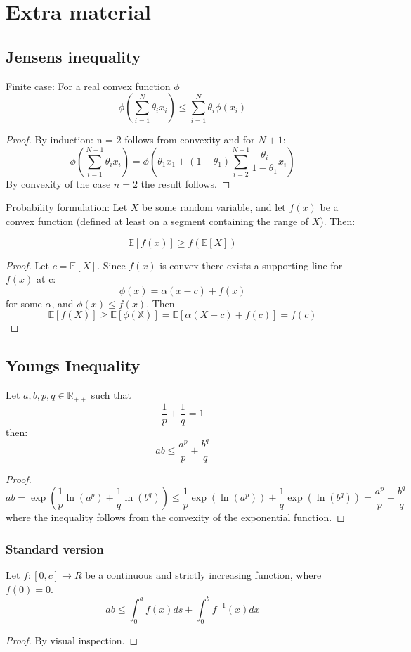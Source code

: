 \documentclass[titlepage]{article}
\begin{document}
\section{Extra material}
\subsection{Jensens inequality}
Finite case: For a real convex function $\phi$
$$\phi\left(\sum_{i= 1}^N \theta_ix_i\right) \leq \sum_{i=1}^N\theta_i \phi(x_i)$$
\begin{proof}
By induction: n = 2 follows from convexity and for $N+1$:
$$\phi\left(\sum_{i= 1}^{N+1} \theta_ix_i\right) =  \phi\left(\theta_1x_1 + (1-\theta_1)\sum_{i= 2}^{N+1} \frac{\theta_i}{1-\theta_1}x_i\right) $$
By convexity of the case $n= 2$ the result follows.
\end{proof}
Probability formulation:
Let $X$ be some random variable, and let $f(x)$ be a convex function (defined at least on a segment containing the range of $X$). Then:

$$\mathbb{E}[f(x)] \geq f(\mathbb{E}[X])$$
\begin{proof}
Let $c = \mathbb{E}[X]$. Since $f(x)$ is convex there exists a supporting line for $f(x)$ at c:
$$\phi(x) = \alpha(x-c) + f(x)$$
for some $\alpha$, and $\phi(x) \leq f(x)$. Then
$$ \mathbb{E}[f(X)] \geq \mathbb{E[\phi(X)]} = \mathbb{E}[\alpha(X-c) + f(c)] = f(c)$$
\end{proof}
\subsection{Youngs Inequality}
Let $a,b ,p, q \in \mathbb{R}_{++}$ such that
$$\frac{1}{p} + \frac{1}{q} = 1$$
then:
$$ab\leq \frac{a^p}{p}+ \frac{b^q}{q} $$
\begin{proof}
$$ab = \exp\left(\frac{1}{p} \ln(a^p) + \frac{1}{q}\ln(b^q)\right) \leq 
\frac{1}{p}\exp(\ln(a^p)) + \frac{1}{q}\exp(\ln(b^q)) = \frac{a^p}{p} + \frac{b^q}{q} $$
where the inequality follows from the convexity of the exponential function.
\end{proof}

\subsubsection{Standard version}
Let $f:[0,c]\longrightarrow R$ be a continuous and strictly increasing function, where $f(0) = 0$.
$$ab\leq\int_0^a f(x)ds + \int_0^b f^{-1}(x)dx $$
\begin{proof}
By visual inspection.
\end{proof}
\end{document}
